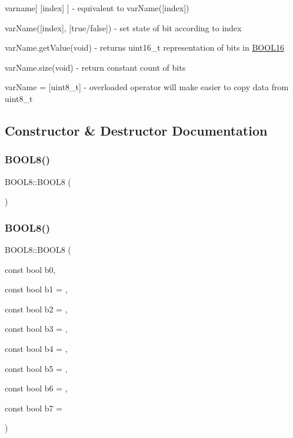 varname\mbox{[} \mbox{[}index\mbox{]} \mbox{]} -\/ equivalent to var\+Name(\mbox{[}index\mbox{]})

var\+Name(\mbox{[}index\mbox{]}, \mbox{[}true/false\mbox{]}) -\/ set state of bit according to index

var\+Name.\+get\+Value(void) -\/ returns uint16\+\_\+t representation of bits in \hyperlink{struct_b_o_o_l16}{B\+O\+O\+L16}

var\+Name.\+size(void) -\/ return constant count of bits

var\+Name = \mbox{[}uint8\+\_\+t\mbox{]} -\/ overloaded operator will make easier to copy data from uint8\+\_\+t 

\subsection{Constructor \& Destructor Documentation}
\hypertarget{struct_b_o_o_l8_a0626071cdc108385bd3b9f15ab0745a9}{}\label{struct_b_o_o_l8_a0626071cdc108385bd3b9f15ab0745a9} 
\subsubsection{\texorpdfstring{B\+O\+O\+L8()}{BOOL8()}\hspace{0.1cm}{\footnotesize\ttfamily [1/2]}}
{\footnotesize\ttfamily B\+O\+O\+L8\+::\+B\+O\+O\+L8 (\begin{DoxyParamCaption}{ }\end{DoxyParamCaption})\hspace{0.3cm}{\ttfamily [default]}}

\hypertarget{struct_b_o_o_l8_ad5e49046c2e60c0a3349c4c864deab15}{}\label{struct_b_o_o_l8_ad5e49046c2e60c0a3349c4c864deab15} 
\subsubsection{\texorpdfstring{B\+O\+O\+L8()}{BOOL8()}\hspace{0.1cm}{\footnotesize\ttfamily [2/2]}}
{\footnotesize\ttfamily B\+O\+O\+L8\+::\+B\+O\+O\+L8 (\begin{DoxyParamCaption}\item[{const bool}]{b0,  }\item[{const bool}]{b1 = {},  }\item[{const bool}]{b2 = {},  }\item[{const bool}]{b3 = {},  }\item[{const bool}]{b4 = {},  }\item[{const bool}]{b5 = {},  }\item[{const bool}]{b6 = {},  }\item[{const bool}]{b7 = {} }\end{DoxyParamCaption})\hspace{0.3cm}{\ttfamily [inline]}}

